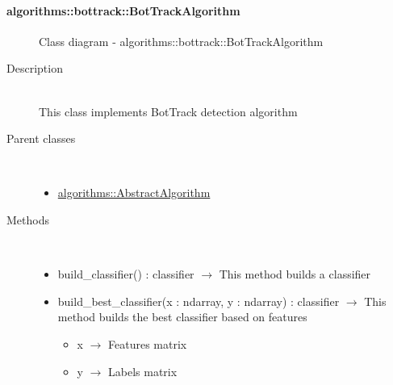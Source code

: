 \paragraph[BotTrackAlgorithm]{algorithms::bottrack::BotTrackAlgorithm}
 \hfill\begin{figure}[h]
\centering
{}
\caption{Class diagram - algorithms::bottrack::BotTrackAlgorithm}
\end{figure}\begin{description}
\item[Description] \hfill \\
 This class implements BotTrack detection algorithm
\item[Parent classes] \hfill \\
 \vspace{-1cm}
\begin{itemize}
\item \hyperlink{algorithms::AbstractAlgorithm}{algorithms::AbstractAlgorithm}
\end{itemize}

\item[Methods] \hfill \\
 \vspace{-1cm}
\begin{itemize}
\item build\_classifier() : classifier $\rightarrow$ This method builds a classifier
\item build\_best\_classifier(x : ndarray, y : ndarray) : classifier $\rightarrow$ This method builds the best classifier based on features\begin{itemize}
\item x $\rightarrow$ Features matrix
\item y $\rightarrow$ Labels matrix
\end{itemize}


\end{itemize}
\end{description}
